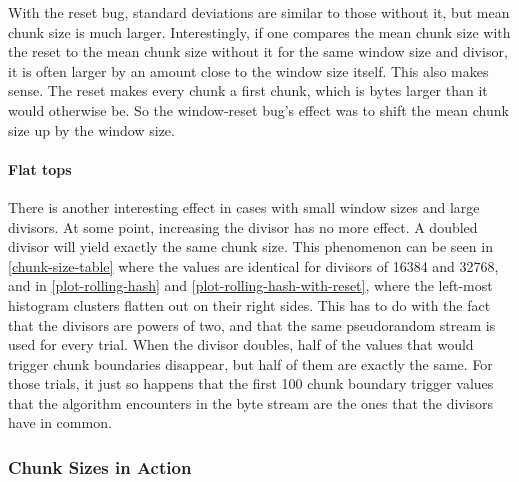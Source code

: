 With the reset bug, standard deviations are similar to those without it, but
mean chunk size is much larger. Interestingly, if one compares the mean chunk
size with the reset to the mean chunk size without it for the same window size
and divisor, it is often larger by an amount close to the window size itself.
This also makes sense. The reset makes every chunk a first chunk, which is
 bytes larger than it would otherwise be. So the
window-reset bug's effect was to shift the mean chunk size up by the window
size.

\paragraph{Flat tops}

There is another interesting effect in cases with small window sizes and large
divisors. At some point, increasing the divisor has no more effect. A doubled
divisor will yield exactly the same chunk size. This phenomenon can be seen in
\autoref{chunk-size-table} where the values are identical for divisors of
\num{16384} and \num{32768}, and in \autoref{plot-rolling-hash} and
\autoref{plot-rolling-hash-with-reset}, where the left-most histogram clusters
flatten out on their right sides. This has to do with the fact that the divisors
are powers of two, and that the same pseudorandom stream is used for every
trial. When the divisor doubles, half of the values that would trigger chunk
boundaries disappear, but half of them are exactly the same. For those trials,
it just so happens that the first \num{100} chunk boundary trigger values that
the algorithm encounters in the byte stream are the ones that the divisors have
in common.

%


\subsubsection{Chunk Sizes in Action}

